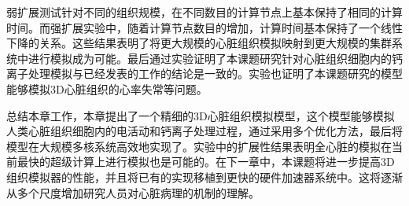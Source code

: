 弱扩展测试针对不同的组织规模，在不同数目的计算节点上基本保持了相同的计算时间。而强扩展实验中，随着计算节点数目的增加，计算时间基本保持了一个线性下降的关系。这些结果表明了将更大规模的心脏组织模拟映射到更大规模的集群系统中进行模拟成为可能。最后通过实验证明了本课题研究针对心脏组织细胞内的钙离子处理模拟与已经发表的工作的结论是一致的。实验也证明了本课题研究的模型能够模拟3D心脏组织的心率失常等问题。

总结本章工作，本章提出了一个精细的3D心脏组织模拟模型，这个模型能够模拟人类心脏组织细胞内的电活动和钙离子处理过程，通过采用多个优化方法，最后将模型在大规模多核系统高效地实现了。实验中的扩展性结果表明全心脏的模拟在当前最快的超级计算上进行模拟也是可能的。在下一章中，本课题将进一步提高3D组织模拟器的性能，并且将已有的实现移植到更快的硬件加速器系统中。这将逐渐从多个尺度增加研究人员对心脏病理的机制的理解。






